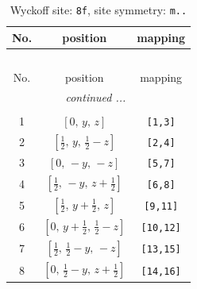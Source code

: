 \documentclass[fleqn,8pt]{jsarticle}
\begin{document}
\begin{longtable}{ccc}
\caption{Wyckoff site: {\tt 8f}, site symmetry: {\tt m..}}
 \\
 \hline \hline
No. & position & mapping \\ \hline \endfirsthead

\multicolumn{2}{l}{\tablename\ \thetable{}} \\
 \hline \hline
No. & position & mapping \\ \hline \endhead

 \hline \hline
\multicolumn{2}{r}{\footnotesize\it continued ...} \\ \endfoot

 \hline \hline
\multicolumn{2}{r}{} \\ \endlastfoot

1 & $\left[ 0,\, y,\, z \right]$ & {\tt [1,3]} \\ \hline
2 & $\left[ \frac{1}{2},\, y,\, \frac{1}{2} - z \right]$ & {\tt [2,4]} \\ \hline
3 & $\left[ 0,\, - y,\, - z \right]$ & {\tt [5,7]} \\ \hline
4 & $\left[ \frac{1}{2},\, - y,\, z + \frac{1}{2} \right]$ & {\tt [6,8]} \\ \hline
5 & $\left[ \frac{1}{2},\, y + \frac{1}{2},\, z \right]$ & {\tt [9,11]} \\ \hline
6 & $\left[ 0,\, y + \frac{1}{2},\, \frac{1}{2} - z \right]$ & {\tt [10,12]} \\ \hline
7 & $\left[ \frac{1}{2},\, \frac{1}{2} - y,\, - z \right]$ & {\tt [13,15]} \\ \hline
8 & $\left[ 0,\, \frac{1}{2} - y,\, z + \frac{1}{2} \right]$ & {\tt [14,16]} \\
\end{longtable}
\renewcommand{\arraystretch}{1.2}
\end{document}
